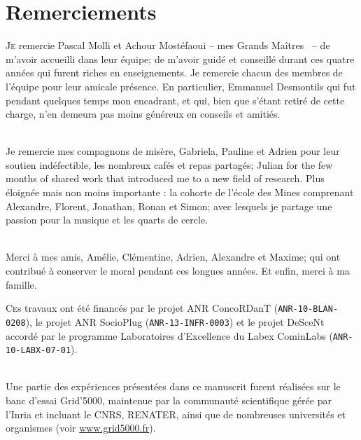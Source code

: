 
\chapter*{Remerciements}

\lettrine{J}e remercie Pascal Molli et Achour Mostéfaoui -- mes \og Grands
Maîtres \fg~-- de m'avoir accueilli dans leur équipe; de m'avoir guidé et
conseillé durant ces quatre années qui furent riches en enseignements. Je
remercie chacun des membres de l'équipe pour leur amicale présence. En
particulier, Emmanuel Desmontils qui fut pendant quelques temps mon encadrant,
et qui, bien que s'étant retiré de cette charge, n'en demeura pas moins généreux
en conseils et amitiés.

\ \\

Je remercie mes compagnons de misère, Gabriela, Pauline et Adrien pour leur
soutien indéfectible, les nombreux cafés et repas partagés; Julian for the few
months of shared work that introduced me to a new field of research. Plus
éloignée mais non moins importante : la cohorte de l'école des Mines comprenant
Alexandre, Florent, Jonathan, Ronan et Simon; avec lesquels je partage une
passion pour la musique et les quarts de cercle.

\ \\

Merci à mes amis, Amélie, Clémentine, Adrien, Alexandre et Maxime; qui ont
contribué à conserver le moral pendant ces longues années.  Et enfin, merci à ma
famille.

\vfill

\lettrine{C}es travaux ont été %
financés par le projet ANR ConcoRDanT (\texttt{ANR-10-BLAN-0208}), le projet ANR
SocioPlug (\texttt{ANR-13-INFR-0003}) et le projet DeSceNt accordé par le
programme \og Laboratoires d'Excellence \fg du Labex CominLabs
(\texttt{ANR-10-LABX-07-01}).

\ \\

Une partie des expériences présentées dans ce manuscrit furent réalisées sur le
banc d'essai Grid'5000, maintenue par la communauté scientifique gérée par
l'Inria et incluant le CNRS, RENATER, ainsi que de nombreuses universités et
organismes (voir \url{www.grid5000.fr}).



